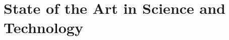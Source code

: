 \clearpage
\section{State of the Art in Science and Technology}
\label{sec:standWiss}


\newcommand{\absatz}[1]{\emph{#1.}}




